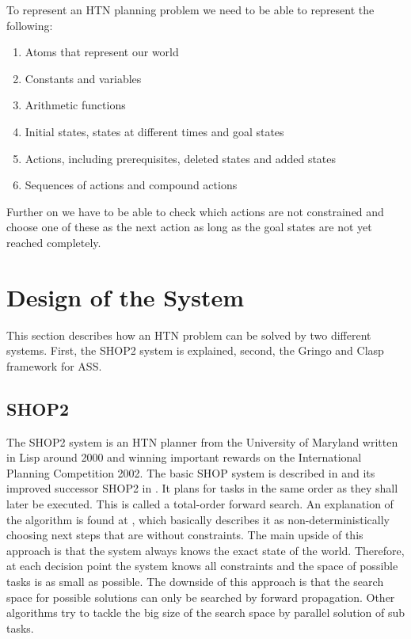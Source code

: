 \documentclass[10pt,a4paper]{article}
\begin{document}
To represent an HTN planning problem we need to be able to represent the following:
\begin{enumerate}\label{HTNreq}
\item Atoms that represent our world
\item Constants and variables
\item Arithmetic functions
\item Initial states, states at different times and goal states
\item Actions, including prerequisites, deleted states and added states
\item Sequences of actions and compound actions
\end{enumerate}
Further on we have to be able to check which actions are not constrained and choose one of these as the next action as long as the goal states are not yet reached completely.


\section{Design of the System}
This section describes how an HTN problem can be solved by two different systems. First, the SHOP2 system is explained, second, the Gringo and Clasp framework for ASS.

\subsection{SHOP2}\label{SHOP}
The SHOP2 system is an HTN planner from the University of Maryland written in Lisp around 2000 and winning important rewards on the International Planning Competition 2002. 
The basic SHOP system is described in \cite{Nau99} and its improved successor SHOP2 in \cite{Nau03}. It plans for tasks in the same order as they shall later be executed. This is called a total-order forward search. An explanation of the algorithm is found at \cite[p.~386ff]{Nau03}, which basically describes it as non-deterministically choosing next steps that are without constraints. The main upside of this approach is that the system always knows the exact state of the world. Therefore, at each decision point the system knows all constraints and the space of possible tasks is as small as possible. The downside of this approach is that the search space for possible solutions can only be searched by forward propagation. Other algorithms try to tackle the big size of the search space by parallel solution of sub tasks.
\end{document}

